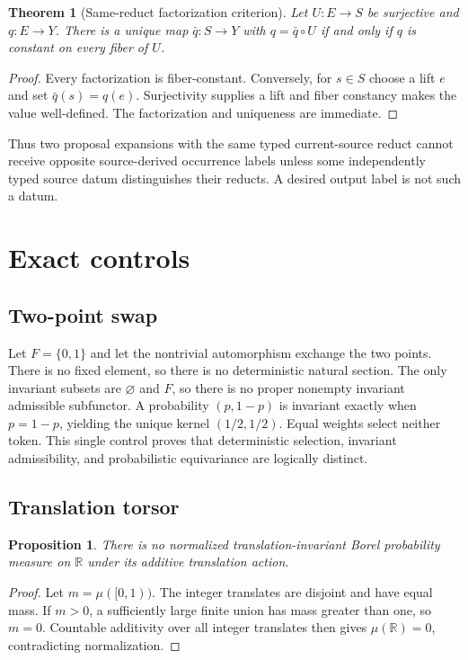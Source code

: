\documentclass[11pt]{article}
\newtheorem{theorem}{Theorem}
\newtheorem{proposition}{Proposition}
\begin{document}
\begin{theorem}[Same-reduct factorization criterion]
Let $U:E\to S$ be surjective and $q:E\to Y$.  There is a unique map
$\bar q:S\to Y$ with $q=\bar q\circ U$ if and only if $q$ is constant on
every fiber of $U$.
\end{theorem}

\begin{proof}
Every factorization is fiber-constant.  Conversely, for $s\in S$ choose a
lift $e$ and set $\bar q(s)=q(e)$.  Surjectivity supplies a lift and fiber
constancy makes the value well-defined.  The factorization and uniqueness are
immediate.
\end{proof}

Thus two proposal expansions with the same typed current-source reduct cannot
receive opposite source-derived occurrence labels unless some independently
typed source datum distinguishes their reducts.  A desired output label is not
such a datum.

\section{Exact controls}

\subsection{Two-point swap}

Let $F=\{0,1\}$ and let the nontrivial automorphism exchange the two points.
There is no fixed element, so there is no deterministic natural section.  The
only invariant subsets are $\varnothing$ and $F$, so there is no proper
nonempty invariant admissible subfunctor.  A probability $(p,1-p)$ is
invariant exactly when $p=1-p$, yielding the unique kernel
$(1/2,1/2)$.  Equal weights select neither token.  This single control proves
that deterministic selection, invariant admissibility, and probabilistic
equivariance are logically distinct.

\subsection{Translation torsor}

\begin{proposition}
There is no normalized translation-invariant Borel probability measure on
$\mathbb R$ under its additive translation action.
\end{proposition}

\begin{proof}
Let $m=\mu([0,1))$.  The integer translates are disjoint and have equal mass.
If $m>0$, a sufficiently large finite union has mass greater than one, so
$m=0$.  Countable additivity over all integer translates then gives
$\mu(\mathbb R)=0$, contradicting normalization.
\end{proof}
\end{document}
